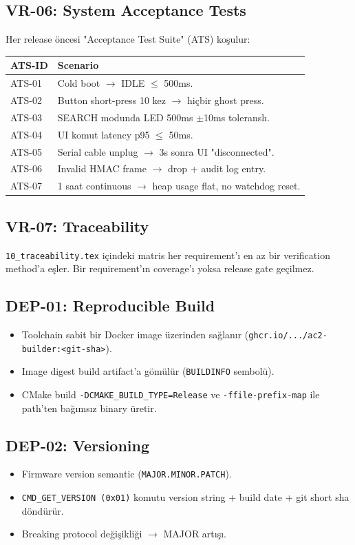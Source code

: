 \subsection{VR-06: System Acceptance Tests}
Her release öncesi "Acceptance Test Suite" (ATS) koşulur:
\begin{tabularx}{\textwidth}{|l|X|}
\hline
\textbf{ATS-ID} & \textbf{Scenario} \\
\hline
ATS-01 & Cold boot $\rightarrow$ IDLE $\leq$ 500ms. \\
ATS-02 & Button short-press 10 kez $\rightarrow$ hiçbir ghost press. \\
ATS-03 & SEARCH modunda LED 500ms $\pm$10ms toleranslı. \\
ATS-04 & UI komut latency p95 $\leq$ 50ms. \\
ATS-05 & Serial cable unplug $\rightarrow$ 3s sonra UI "disconnected". \\
ATS-06 & Invalid HMAC frame $\rightarrow$ drop + audit log entry. \\
ATS-07 & 1 saat continuous $\rightarrow$ heap usage flat, no watchdog reset. \\
\hline
\end{tabularx}

\subsection{VR-07: Traceability}
\texttt{10\_traceability.tex} içindeki matris her requirement'ı en az bir verification method'a eşler. Bir requirement'ın coverage'ı yoksa release gate geçilmez.

\subsection{DEP-01: Reproducible Build}
\begin{itemize}
    \item Toolchain sabit bir Docker image üzerinden sağlanır (\texttt{ghcr.io/.../ac2-builder:<git-sha>}).
    \item Image digest build artifact'a gömülür (\texttt{BUILDINFO} sembolü).
    \item CMake build \texttt{-DCMAKE\_BUILD\_TYPE=Release} ve \texttt{-ffile-prefix-map} ile path'ten bağımsız binary üretir.
\end{itemize}

\subsection{DEP-02: Versioning}
\begin{itemize}
    \item Firmware version semantic (\texttt{MAJOR.MINOR.PATCH}).
    \item \texttt{CMD\_GET\_VERSION (0x01)} komutu version string + build date + git short sha döndürür.
    \item Breaking protocol değişikliği $\rightarrow$ MAJOR artışı.
\end{itemize}

